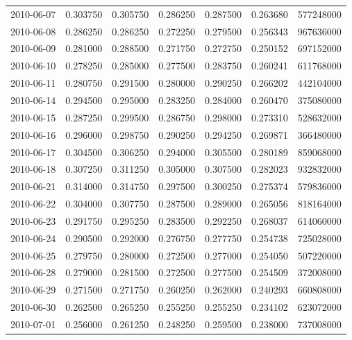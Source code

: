 \begin{tabular}{lrrrrrr}
2010-06-07 &    0.303750 &    0.305750 &    0.286250 &    0.287500 &    0.263680 &   577248000 \\
2010-06-08 &    0.286250 &    0.286250 &    0.272250 &    0.279500 &    0.256343 &   967636000 \\
2010-06-09 &    0.281000 &    0.288500 &    0.271750 &    0.272750 &    0.250152 &   697152000 \\
2010-06-10 &    0.278250 &    0.285000 &    0.277500 &    0.283750 &    0.260241 &   611768000 \\
2010-06-11 &    0.280750 &    0.291500 &    0.280000 &    0.290250 &    0.266202 &   442104000 \\
2010-06-14 &    0.294500 &    0.295000 &    0.283250 &    0.284000 &    0.260470 &   375080000 \\
2010-06-15 &    0.287250 &    0.299500 &    0.286750 &    0.298000 &    0.273310 &   528632000 \\
2010-06-16 &    0.296000 &    0.298750 &    0.290250 &    0.294250 &    0.269871 &   366480000 \\
2010-06-17 &    0.304500 &    0.306250 &    0.294000 &    0.305500 &    0.280189 &   859068000 \\
2010-06-18 &    0.307250 &    0.311250 &    0.305000 &    0.307500 &    0.282023 &   932832000 \\
2010-06-21 &    0.314000 &    0.314750 &    0.297500 &    0.300250 &    0.275374 &   579836000 \\
2010-06-22 &    0.304000 &    0.307750 &    0.287500 &    0.289000 &    0.265056 &   818164000 \\
2010-06-23 &    0.291750 &    0.295250 &    0.283500 &    0.292250 &    0.268037 &   614060000 \\
2010-06-24 &    0.290500 &    0.292000 &    0.276750 &    0.277750 &    0.254738 &   725028000 \\
2010-06-25 &    0.279750 &    0.280000 &    0.272500 &    0.277000 &    0.254050 &   507220000 \\
2010-06-28 &    0.279000 &    0.281500 &    0.272500 &    0.277500 &    0.254509 &   372008000 \\
2010-06-29 &    0.271500 &    0.271750 &    0.260250 &    0.262000 &    0.240293 &   660808000 \\
2010-06-30 &    0.262500 &    0.265250 &    0.255250 &    0.255250 &    0.234102 &   623072000 \\
2010-07-01 &    0.256000 &    0.261250 &    0.248250 &    0.259500 &    0.238000 &   737008000 \\

\end{tabular}
